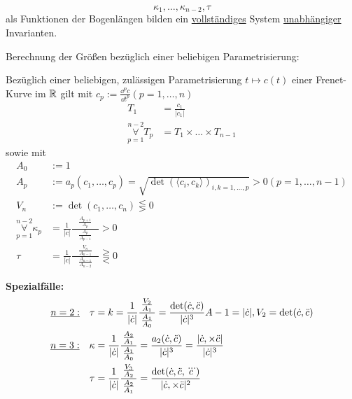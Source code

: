 \begin{satz}[Fundamentalsatz]\label{satz142}
\[\kappa_1, \ldots, \kappa_{n-2}, \tau\] 
als Funktionen der Bogenlängen bilden ein \uline{vollständiges} System  \uline{unabhängiger} Invarianten.
\end{satz}
Berechnung der Größen bezüglich einer beliebigen Parametrisierung:
\begin{folgerung}
Bezüglich einer beliebigen, zulässigen Parametrisierung \(t \mapsto c(t)\) einer Frenet-Kurve im \(\mathbb{R}\) gilt mit \(c_p:=\frac{\dd^p c}{\dd t^p} (p=1, \dots , n)\)
\begin{align*}
 T_1 &=\frac{c_1}{|c_1|}\\
 \overset{n-2}{\underset{p=1}{\forall}} T_p &= T_1 \times \ldots \times T_{n-1}
\end{align*}
sowie mit
\begin{align*}
 A_0 &:= 1\\
 A_p &:= a_p \left(c_1, \ldots , c_p \right) = \sqrt{\det \left( \langle c_i, c_k \rangle \right)_{i,k = 1, \ldots , p}} > 0 (p = 1, \ldots, n-1)\\
 V_n &:= \det \left(c_1, \ldots , c_n \right) \lesseqgtr 0\\
 \overset{n-2}{\underset{p=1}{\forall}} \kappa_p &= \frac{1}{|\dot c|} \frac{\quad \frac{A_{p+1}}{A_p}\quad}{ \frac{A_p}{A_{p-1}} } > 0\\
 \tau &= \frac{1}{|\dot c|} \frac{\quad \frac{V_n}{A_{n-1}}\quad}{\frac{A_{n-1}}{A_{n-2}}} \gtreqqless 0
\end{align*}
\end{folgerung}
\textbf{Spezialfälle:}\\
\begin{align*}
\uline{n=2:}\quad \tau &= k = \frac{1}{|\dot c|} \frac{\,\frac{V_2}{A_1}\,}{\frac{A_1}{A_0}} = \frac{\det(\dot c, \ddot c)}{|\dot c|^3} A-1 = |\dot c|, V_2 = \det (\dot c, \ddot c) \\
\uline{n=3:}\quad \kappa &= \frac{1}{|\dot c|} \frac{\,\frac{A_2}{A_1}\,}{\frac{A_1}{A_0}} = \frac{a_2 (\dot c, \ddot c)}{|\dot c|^3} = \frac{|\dot c, \times \ddot c|}{|\dot c|^3} \\
\tau &= \frac{1}{|\dot c|} \frac{\,\frac{V_3}{A_2}\,}{\frac{A_2}{A_1}} = \frac{\det (\dot c, \ddot c, \dddot c)}{|\dot c,\times \ddot c|^2} 
\end{align*}
